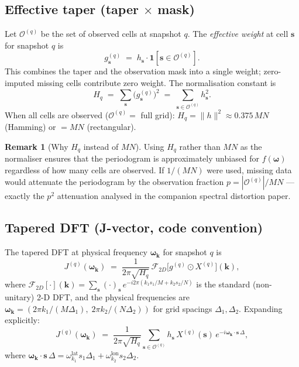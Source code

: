 \documentclass[12pt]{article}
\theoremstyle{definition}
\newtheorem{remark}{Remark}
\begin{document}
\subsection{Effective taper (taper $\times$ mask)}

Let $\mathcal{O}^{(q)}$ be the set of observed cells at snapshot $q$.
The \emph{effective weight} at cell $\mathbf{s}$ for snapshot $q$ is
\[
  g^{(q)}_{\mathbf{s}} \;=\; h_{\mathbf{s}}\cdot\mathbf{1}[\mathbf{s}\in\mathcal{O}^{(q)}].
\]
This combines the taper and the observation mask into a single weight;
zero-imputed missing cells contribute zero weight.
The normalisation constant is
\[
  H_q \;=\; \sum_{\mathbf{s}}\bigl(g^{(q)}_{\mathbf{s}}\bigr)^2
       \;=\; \sum_{\mathbf{s}\in\mathcal{O}^{(q)}} h_{\mathbf{s}}^2.
\]
When all cells are observed ($\mathcal{O}^{(q)} = $ full grid):
$H_q = \|h\|^2 \approx 0.375\,MN$ (Hamming) or $= MN$ (rectangular).

\begin{remark}[Why $H_q$ instead of $MN$]
Using $H_q$ rather than $MN$ as the normaliser ensures that the
periodogram is approximately unbiased for $f(\boldsymbol{\omega})$ regardless
of how many cells are observed.
If $1/(MN)$ were used, missing data would attenuate the periodogram
by the observation fraction $p = |\mathcal{O}^{(q)}|/MN$ --- exactly
the $p^2$ attenuation analysed in the companion spectral distortion paper.
\end{remark}

\subsection{Tapered DFT (J-vector, code convention)}

The tapered DFT at physical frequency $\boldsymbol{\omega}_{\mathbf{k}}$ for snapshot $q$ is
\[
\boxed{
  J^{(q)}(\boldsymbol{\omega}_{\mathbf{k}})
  \;=\; \frac{1}{2\pi\sqrt{H_q}}\,
    \mathcal{F}_{2D}\!\bigl[g^{(q)}\odot X^{(q)}\bigr](\mathbf{k}),
}
\]
where $\mathcal{F}_{2D}[\cdot](\mathbf{k}) = \sum_{\mathbf{s}}(\cdot)_{\mathbf{s}}\,
e^{-i2\pi(k_1 s_1/M + k_2 s_2/N)}$ is the standard (non-unitary) 2-D DFT,
and the physical frequencies are
$\boldsymbol{\omega}_{\mathbf{k}} = (2\pi k_1/(M\Delta_1),\; 2\pi k_2/(N\Delta_2))$
for grid spacings $\Delta_1, \Delta_2$.
Expanding explicitly:
\[
  J^{(q)}(\boldsymbol{\omega}_{\mathbf{k}})
  \;=\; \frac{1}{2\pi\sqrt{H_q}}\sum_{\mathbf{s}\in\mathcal{O}^{(q)}}
    h_{\mathbf{s}}\,X^{(q)}(\mathbf{s})\,
    e^{-i\boldsymbol{\omega}_{\mathbf{k}}\cdot\mathbf{s}\,\Delta},
\]
where $\boldsymbol{\omega}_{\mathbf{k}}\cdot\mathbf{s}\,\Delta = \omega^{\mathrm{lat}}_{k_1} s_1\Delta_1
+ \omega^{\mathrm{lon}}_{k_2} s_2\Delta_2$.
\end{document}

